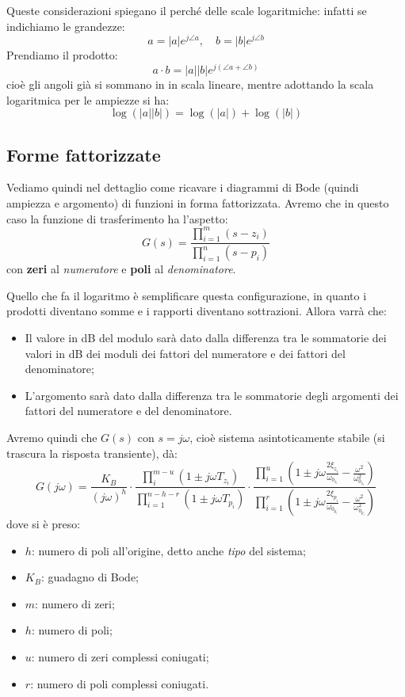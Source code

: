 \documentclass[a4paper,11pt]{article}
\begin{document}
Queste considerazioni spiegano il perché delle scale logaritmiche: infatti se indichiamo le grandezze:
$$
a = |a| e^{j \angle a}, \quad b = |b| e^{j \angle b}
$$
Prendiamo il prodotto:
$$
a \cdot b = |a| |b| e^{j (\angle a + \angle b)}
$$
cioè gli angoli già si sommano in in scala lineare, mentre adottando la scala logaritmica per le ampiezze si ha:
$$
\log \left( |a||b| \right) = \log \left( |a| \right) + \log \left( |b| \right)
$$

\subsection{Forme fattorizzate}
Vediamo quindi nel dettaglio come ricavare i diagrammi di Bode (quindi ampiezza e argomento) di funzioni in forma fattorizzata.
Avremo che in questo caso la funzione di trasferimento ha l'aspetto:
\begin{equation}
G(s) = \frac{\prod_{i=1}^m(s - z_i)}{\prod_{i=1}^n(s - p_i)}
\end{equation}
con \textbf{zeri} al \textit{numeratore} e \textbf{poli} al \textit{denominatore}.

Quello che fa il logaritmo è semplificare questa configurazione, in quanto i prodotti diventano somme e i rapporti diventano sottrazioni.
Allora varrà che:
\begin{itemize}
	\item Il valore in dB del modulo sarà dato dalla differenza tra le sommatorie dei valori in dB dei moduli dei fattori del numeratore e dei fattori del denominatore;
	\item L'argomento sarà dato dalla differenza tra le sommatorie degli argomenti dei fattori del numeratore e del denominatore.
\end{itemize}

Avremo quindi che $G(s)$ con $s = j\omega$, cioè sistema asintoticamente stabile (si trascura la risposta transiente), dà:
$$
G(j \omega) = \frac{K_B}{(j \omega)^h} 
\cdot
\frac{ \prod_{i}^{m - u} (1 \pm j \omega T_{z_i}) }{ \prod_{i = 1}^{n - h - r} (1 \pm j \omega T_{p_i}) } 
\cdot
\frac{ \prod_{i = 1}^u \left( 1 \pm j \omega \frac{ 2 \xi_{z_i} }{\omega_{0_{z_i}}} - \frac{\omega^2}{\omega_{0_{z_i}}^2} \right) }{ \prod_{i = 1}^r \left( 1 \pm j \omega \frac{ 2 \xi_{p_i} }{\omega_{0_{p_i}}} - \frac{\omega^2}{\omega_{0_{p_i}}^2} \right) }
$$
dove si è preso:
\begin{itemize}
	\item $h$: numero di poli all'origine, detto anche \textit{tipo} del sistema; 
	\item $K_B$: guadagno di Bode;
	\item $m$: numero di zeri;
	\item $h$: numero di poli;
	\item $u$: numero di zeri complessi coniugati;
	\item $r$: numero di poli complessi coniugati.
\end{itemize}
\end{document}
